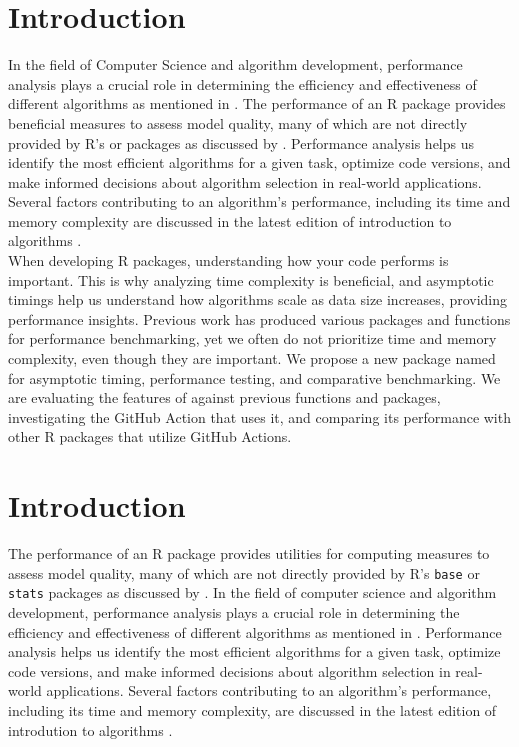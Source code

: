 \section{Introduction}
 In the field of Computer Science and algorithm development, performance analysis plays a crucial role in determining the efficiency and effectiveness of different algorithms as mentioned in \cite{knuth1997art}. The performance of an R package provides beneficial measures to assess model quality, many of which are not directly provided by R's  or  packages as discussed by \cite{RcoreTeam}. Performance analysis helps us identify the most efficient algorithms for a given task, optimize code versions, and make informed decisions about algorithm selection in real-world applications. Several factors contributing to an algorithm's performance, including its time and memory complexity are discussed in the latest edition of introduction to algorithms \cite{cormen2022introduction}.\\


When developing R packages, understanding how your code performs is important. This is why analyzing time complexity is beneficial, and asymptotic timings help us understand how algorithms scale as data size increases, providing performance insights. Previous work has produced various packages and functions for performance benchmarking, yet we often do not prioritize time and memory complexity, even though they are important.
We propose a new package named  for asymptotic timing, performance testing, and comparative benchmarking. We are evaluating the features of  against previous functions and packages, investigating the GitHub Action that uses it, and comparing its performance with other R packages that utilize GitHub Actions. 

\section{Introduction}
The performance of an R package provides utilities for computing measures to assess model quality, many of which are not directly provided by R's \texttt{base} or \texttt{stats} packages as discussed by \cite{system.time}. In the field of computer science and algorithm development, performance analysis plays a crucial role in determining the efficiency and effectiveness of different algorithms as mentioned in \cite{knuth1997art}. Performance analysis helps us identify the most efficient algorithms for a given task, optimize code versions, and make informed decisions about algorithm selection in real-world applications. Several factors contributing to an algorithm's performance, including its time and memory complexity, are discussed in the latest edition of introdution to algorithms \cite{cormen2022introduction}.\\

